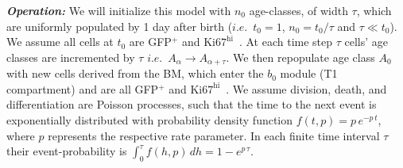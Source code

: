 \documentclass[11pt]{article}
\newcommand{\khi}{\ensuremath{\text{Ki67}^\text{hi}}~}
\newcommand\ie{$\textit{i.e.}$}
\begin{document}
\textbf{\textit{Operation:}}
We will initialize this model with $n_0$ age-classes, of width $\tau$, which are uniformly populated by 1 day after birth (\ie~$t_0=1$, $ n_0= t_\text{0}/{\tau}$ and $\tau \ll t_{0}$). We assume all cells at $t_{0}$ are GFP$^{+}$ and {\khi}.
At each time step $\tau$ cells' age classes are incremented by $\tau$ \ie~$A_\alpha \rightarrow A_{\alpha+\tau}$.
We then repopulate age class $A_0$ with new cells derived from the BM, which enter the $b_0$ module (T1 compartment) and are all GFP$^{+}$ and \khi.
We assume division, death, and differentiation are Poisson  processes, such that the time to the next event is exponentially distributed with probability density function $f(t, p)= p\,e^{-p\,t}$, where $p$ represents the respective rate parameter.
In each finite time interval $\tau$ their event-probability  is  $\int_{0}^{\tau} f(h, p) \, dh = 1 - e^{p \,\tau}$. %
\end{document}
